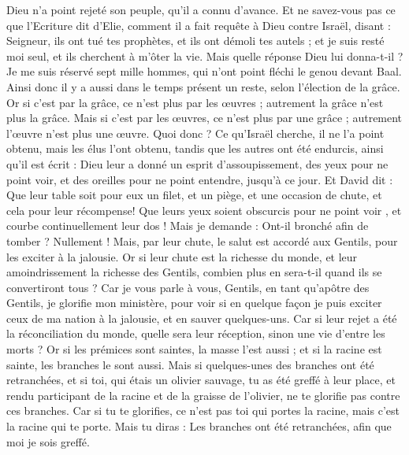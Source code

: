 \begin{multicols}{2}
Dieu n'a point rejeté son peuple, qu'il a connu d'avance. Et ne savez-vous pas ce que l'Ecriture dit d'Elie, comment il a fait requête à Dieu contre Israël, disant :
Seigneur, ils ont tué tes prophètes, et ils ont démoli tes autels ; et je suis resté moi seul, et ils cherchent à m'ôter la vie.
Mais quelle réponse Dieu lui donna-t-il ? Je me suis réservé sept mille hommes, qui n'ont point fléchi le genou devant Baal.
Ainsi donc il y a aussi dans le temps présent un reste, selon l'élection de la grâce.
Or si c'est par la grâce, ce n'est plus par les œuvres ; autrement la grâce n'est plus la grâce. Mais si c'est par les œuvres, ce n'est plus par une grâce ; autrement l'œuvre n'est plus une œuvre.
Quoi donc ? Ce qu'Israël cherche, il ne l'a point obtenu, mais les élus l'ont obtenu, tandis que les autres ont été endurcis,
ainsi qu'il est écrit : Dieu leur a donné un esprit d'assoupissement, des yeux pour ne point voir, et des oreilles pour ne point entendre, jusqu'à ce jour. Et David dit :
Que leur table soit pour eux un filet, et un piège, et une occasion de chute, et cela pour leur récompense!
Que leurs yeux soient obscurcis pour ne point voir , et courbe continuellement leur dos !
Mais je demande : Ont-il bronché afin de tomber ? Nullement ! Mais, par leur chute, le salut est accordé aux Gentils, pour les exciter à la jalousie.
Or si leur chute est la richesse du monde, et leur amoindrissement la richesse des Gentils, combien plus en sera-t-il quand ils se convertiront tous ?
Car je vous parle à vous, Gentils, en tant qu'apôtre des Gentils, je glorifie mon ministère,
pour voir si en quelque façon je puis exciter ceux de ma nation à la jalousie, et en sauver quelques-uns.
Car si leur rejet a été la réconciliation du monde, quelle sera leur réception, sinon une vie d'entre les morts ?
Or si les prémices sont saintes, la masse l'est aussi ; et si la racine est sainte, les branches le sont aussi.
Mais si quelques-unes des branches ont été retranchées, et si toi, qui étais un olivier sauvage, tu as été greffé à leur place, et rendu participant de la racine et de la graisse de l'olivier,
ne te glorifie pas contre ces branches. Car si tu te glorifies, ce n'est pas toi qui portes la racine, mais c'est la racine qui te porte.
Mais tu diras : Les branches ont été retranchées, afin que moi je sois greffé.

\end{multicols}
